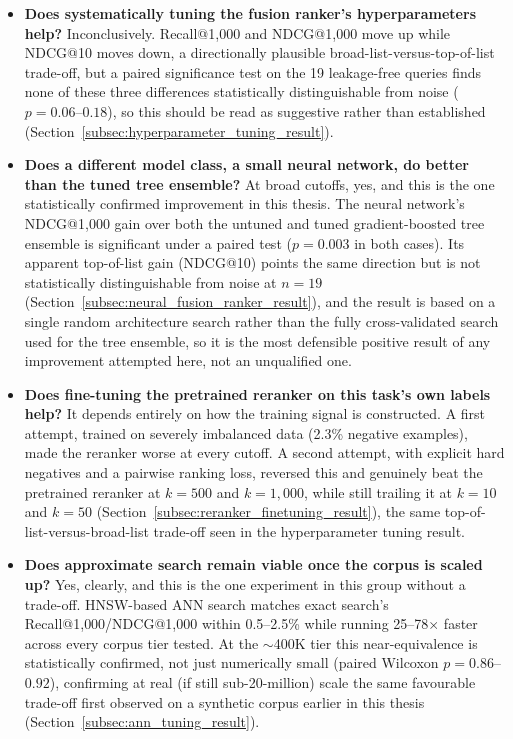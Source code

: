 \documentclass[a4paper,oneside,bibliography=totoc]{scrbook}
\begin{document}
\begin{itemize}
\item \textbf{Does systematically tuning the fusion ranker's hyperparameters help?} Inconclusively. Recall@1{,}000 and NDCG@1{,}000 move up while NDCG@10 moves down, a directionally plausible broad-list-versus-top-of-list trade-off, but a paired significance test on the 19 leakage-free queries finds none of these three differences statistically distinguishable from noise ($p=0.06$--$0.18$), so this should be read as suggestive rather than established (Section~\ref{subsec:hyperparameter_tuning_result}).
\item \textbf{Does a different model class, a small neural network, do better than the tuned tree ensemble?} At broad cutoffs, yes, and this is the one statistically confirmed improvement in this thesis. The neural network's NDCG@1{,}000 gain over both the untuned and tuned gradient-boosted tree ensemble is significant under a paired test ($p=0.003$ in both cases). Its apparent top-of-list gain (NDCG@10) points the same direction but is not statistically distinguishable from noise at $n=19$ (Section~\ref{subsec:neural_fusion_ranker_result}), and the result is based on a single random architecture search rather than the fully cross-validated search used for the tree ensemble, so it is the most defensible positive result of any improvement attempted here, not an unqualified one.
\item \textbf{Does fine-tuning the pretrained reranker on this task's own labels help?} It depends entirely on how the training signal is constructed. A first attempt, trained on severely imbalanced data (2.3\% negative examples), made the reranker worse at every cutoff. A second attempt, with explicit hard negatives and a pairwise ranking loss, reversed this and genuinely beat the pretrained reranker at $k=500$ and $k=1{,}000$, while still trailing it at $k=10$ and $k=50$ (Section~\ref{subsec:reranker_finetuning_result}), the same top-of-list-versus-broad-list trade-off seen in the hyperparameter tuning result.
\item \textbf{Does approximate search remain viable once the corpus is scaled up?} Yes, clearly, and this is the one experiment in this group without a trade-off. HNSW-based ANN search matches exact search's Recall@1{,}000/NDCG@1{,}000 within 0.5--2.5\% while running 25--78$\times$ faster across every corpus tier tested. At the $\sim$400K tier this near-equivalence is statistically confirmed, not just numerically small (paired Wilcoxon $p=0.86$--$0.92$), confirming at real (if still sub-20-million) scale the same favourable trade-off first observed on a synthetic corpus earlier in this thesis (Section~\ref{subsec:ann_tuning_result}).
\end{itemize}
\end{document}
